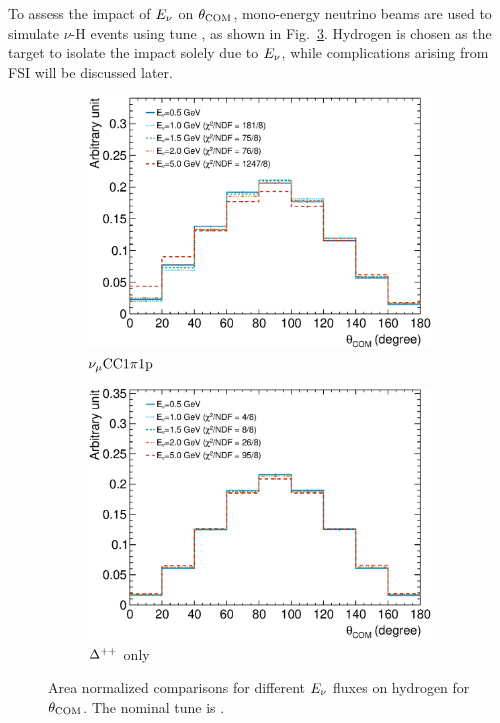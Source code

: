      To assess the impact of $E_{\nu}$ on $\theta_{\textrm{COM}}$, mono-energy neutrino beams are used to simulate $\nu$-H events using tune \gZero, as shown in Fig.~\ref{fig:enu-comp-h}.
     Hydrogen is chosen as the target to isolate the impact solely due to $E_{\nu}$, while complications arising from FSI will be discussed later.
     \begin{figure}[ht!]
     \centering
     \begin{subfigure}[ht!]{\dbfigwid\textwidth}
          \centering
          \includegraphics[width=\textwidth]{figures/COM/anorm-enu-9bin-_da_tan.eps}
          \caption{$\nu_{\mu}\textrm{CC}1\pi1\textrm{p}$}
          \label{subfig:enu-comp-cc1pi1p}
     \end{subfigure}
     \begin{subfigure}[ht!]{\dbfigwid\textwidth}
          \centering
          \includegraphics[width=\textwidth]{figures/COM/anorm-enu-9bin-resonly-_da_tan.eps}
          \caption{$\Delta^{++}$ only}
          \label{subfig:enu-comp-dpp}
     \end{subfigure}
     \caption{Area normalized comparisons for different $E_{\nu}$ fluxes on hydrogen for $\theta_{\textrm{COM}}$. The nominal tune is \gZero.}
     \label{fig:enu-comp-h}
     \end{figure}

